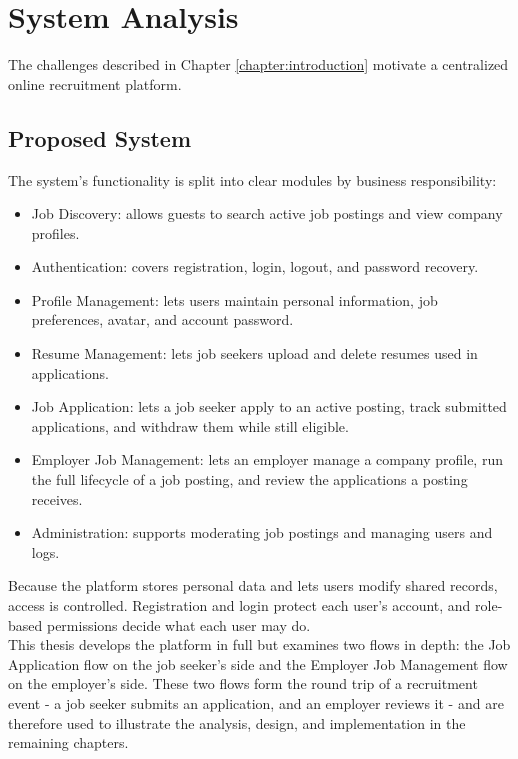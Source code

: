 
\chapter{System Analysis}
\label{chapter:system-analysis}
The challenges described in Chapter \ref{chapter:introduction} motivate a centralized online recruitment platform.

\section{Proposed System}
\label{c3:section:proposed-system}

The system's functionality is split into clear modules by business responsibility:

\begin{itemize}
	\item Job Discovery: allows guests to search active job postings and view company profiles.
	\item Authentication: covers registration, login, logout, and password recovery.
	\item Profile Management: lets users maintain personal information, job preferences, avatar, and account password.
	\item Resume Management: lets job seekers upload and delete resumes used in applications.
	\item Job Application: lets a job seeker apply to an active posting, track submitted applications, and withdraw them while still eligible.
	\item Employer Job Management: lets an employer manage a company profile, run the full lifecycle of a job posting, and review the applications a posting receives.
	\item Administration: supports moderating job postings and managing users and logs.
\end{itemize}
Because the platform stores personal data and lets users modify shared records, access is controlled. Registration and login protect each user's account, and role-based permissions decide what each user may do.\\
This thesis develops the platform in full but examines two flows in depth: the Job Application flow on the job seeker's side and the Employer Job Management flow on the employer's side. These two flows form the round trip of a recruitment event - a job seeker submits an application, and an employer reviews it - and are therefore used to illustrate the analysis, design, and implementation in the remaining chapters.

